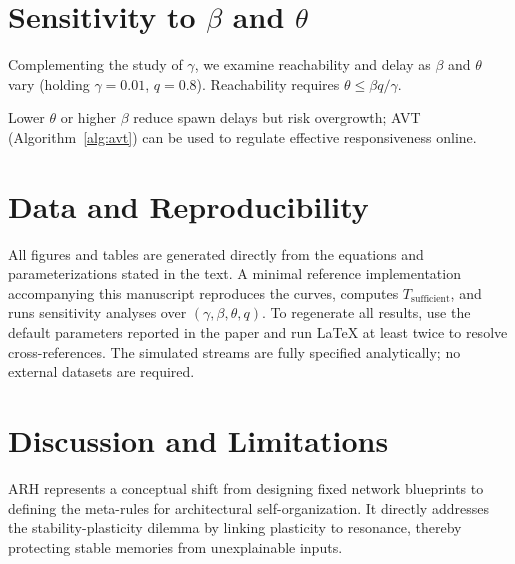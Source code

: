 \documentclass{article}
\numberwithin{figure}{section}
\numberwithin{table}{section}
\numberwithin{algorithm}{section}
\begin{document}
\section{Sensitivity to \texorpdfstring{$\beta$}{beta} and \texorpdfstring{$\theta$}{theta}}
Complementing the study of $\gamma$, we examine reachability and delay as $\beta$ and $\theta$ vary (holding $\gamma=0.01$, $q=0.8$). Reachability requires $\theta \le \beta q/\gamma$.
\begin{table}[h]
\centering
\caption{Analytical sensitivity to \texorpdfstring{$\beta$}{beta} and \texorpdfstring{$\theta$}{theta} at $\gamma=0.01$, $q=0.8$. If $\theta > \beta q/\gamma$, the threshold is unreachable (no spawn).}
\label{tab:beta_theta_sensitivity}
\end{table}
Lower $\theta$ or higher $\beta$ reduce spawn delays but risk overgrowth; AVT (Algorithm~\ref{alg:avt}) can be used to regulate effective responsiveness online.

\section{Data and Reproducibility}
All figures and tables are generated directly from the equations and parameterizations stated in the text. A minimal reference implementation accompanying this manuscript reproduces the curves, computes $T_{\mathrm{sufficient}}$, and runs sensitivity analyses over $(\gamma,\beta,\theta,q)$. To regenerate all results, use the default parameters reported in the paper and run LaTeX at least twice to resolve cross-references. The simulated streams are fully specified analytically; no external datasets are required.

\section{Discussion and Limitations}
ARH represents a conceptual shift from designing fixed network blueprints to defining the meta-rules for architectural self-organization. It directly addresses the stability-plasticity dilemma by linking plasticity to resonance, thereby protecting stable memories from unexplainable inputs.
\end{document}
